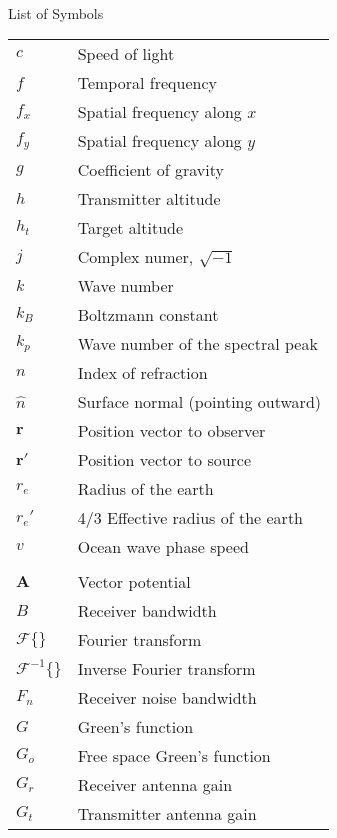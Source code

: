 \renewcommand{\baselinestretch}{1}
\small\normalsize
\hbox{\ }

\vspace{-4em}

\begin{center}
\large{List of Symbols}
\end{center} 

\vspace{3pt}

\begin{supertabular}{ll}
$c$ & Speed of light \\
$f$ & Temporal frequency \\
$f_x$ & Spatial frequency along $x$ \\
$f_y$ & Spatial frequency along $y$ \\
$g$ & Coefficient of gravity \\
$h$ & Transmitter altitude\\
$h_t$ & Target altitude \\
$j$ & Complex numer, $\sqrt{-1}$ \\
$k$ & Wave number \\
$k_B$ & Boltzmann constant \\
$k_p$ & Wave number of the spectral peak \\
$n$ & Index of refraction \\
$\hat{n}$ & Surface normal (pointing outward) \\
$\mathbf{r}$ & Position vector to observer \\
$\mathbf{r}'$ & Position vector to source \\
$r_e$ & Radius of the earth \\
$r_e'$ & 4/3 Effective radius of the earth \\
$v$ & Ocean wave phase speed \\
\\
$\mathbf{A}$ & Vector potential \\
$B$ & Receiver bandwidth \\
$\mathcal{F}\{\}$ & Fourier transform \\
$\mathcal{F}^{-1}\{\}$ & Inverse Fourier transform \\
$F_n$ & Receiver noise bandwidth \\
$G$ & Green's function \\
$G_o$ & Free space Green's function \\
$G_r$ & Receiver antenna gain \\
$G_t$ & Transmitter antenna gain \\

\end{supertabular}
